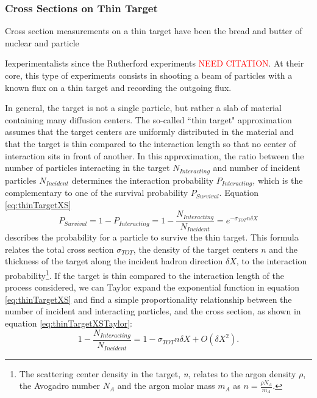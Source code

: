 \subsubsection{Cross Sections on Thin Target}
Cross section measurements on a thin target have been the bread and butter of nuclear and particle {Iexperimentalists since the Rutherford experiments \textcolor{red}{NEED CITATION}. At their core, this type of experiments consists in shooting a beam of particles with a known flux on a thin target and recording the outgoing flux. 


In general, the target is not a single particle, but rather a slab of material containing many diffusion centers. The so-called  ``thin target" approximation assumes that the target centers are uniformly distributed in the material and that the target is thin compared to the interaction length so that no center of interaction sits in front of another. In this approximation, the ratio between the number of particles interacting in the target $N_{Interacting}$ and number of incident particles $N_{Incident}$ determines the interaction probability $P_{Interacting}$, which is the complementary to one of the survival probability $P_{Survival}$. 
Equation \ref{eq:thinTargetXS} 
\begin{equation}
P_{Survival} = 1- P_{Interacting} = 1 - \frac{N_{Interacting}}{N_{Incident}} = e^{-\sigma_{TOT} n \delta X}
\label{eq:thinTargetXS}
\end{equation}
describes the probability for a particle to survive the thin target. This formula relates the total cross section $\sigma_{TOT}$, the density of the target centers  $n$  and  the thickness of the target  along the incident hadron direction $\delta X$, to the interaction probability\footnote{The scattering center density in the target, {\emph{n}},  relates to the argon density $\rho$, the Avogadro number  $ N_{A} $ and the argon molar mass $m_A$ as $n=\frac{\rho N_{A} }{m_A}$.}. If the target is thin compared to the interaction length of the process considered, we can Taylor expand the exponential function in equation \ref{eq:thinTargetXS} and find a simple proportionality relationship between the number of incident and interacting particles, and the cross section, as shown in equation \ref{eq:thinTargetXSTaylor}:
\begin{equation}
1 - \frac{N_{Interacting}}{N_{Incident}} =  1 -\sigma_{TOT} n \delta X + O(\delta X^2).
\label{eq:thinTargetXSTaylor}
\end{equation}

}
